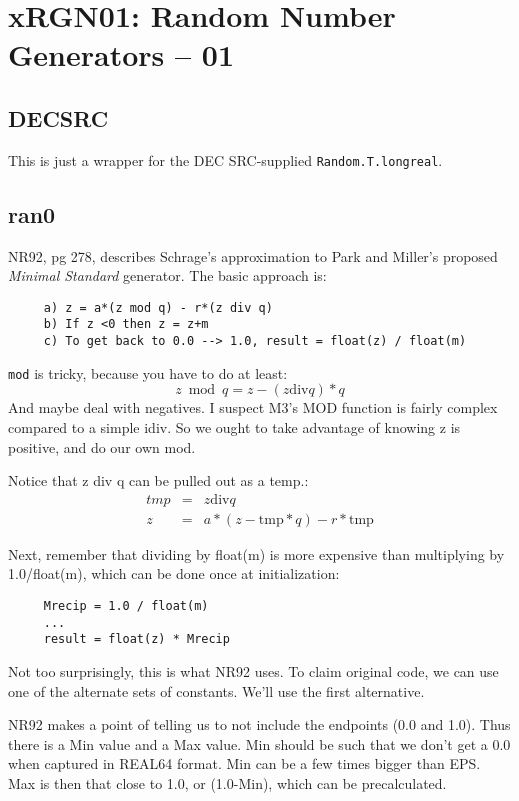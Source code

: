 \section{xRGN01: Random Number Generators -- 01}

\subsection*{DECSRC}
This is just a wrapper for the DEC SRC-supplied {\tt Random.T.longreal}.

\subsection*{ran0}
NR92, pg 278, describes Schrage's approximation to Park and Miller's
proposed {\em Minimal Standard} generator. The basic approach is:
\begin{verbatim}
     a) z = a*(z mod q) - r*(z div q)
     b) If z <0 then z = z+m
     c) To get back to 0.0 --> 1.0, result = float(z) / float(m)
\end{verbatim}
     
{\tt mod} is tricky, because you have to do at least:
\begin{equation}
  z \bmod q = z - (z \mbox{div} q)*q
\end{equation}
And maybe deal with negatives.  I suspect M3's MOD function
is fairly complex compared to a simple idiv.  So we ought to
take advantage of knowing z is positive, and do our own mod.

Notice that z div q can be pulled out as a temp.:
\begin{eqnarray}
     tmp & = & z \mbox{div} q\\
     z & = & a*(z - \mbox{tmp}*q) - r*\mbox{tmp}
\end{eqnarray}

Next, remember that dividing by float(m) is more expensive than
multiplying by 1.0/float(m), which can be done once at
initialization:
\begin{verbatim}
     Mrecip = 1.0 / float(m)
     ...
     result = float(z) * Mrecip
\end{verbatim}
     
Not too surprisingly, this is what NR92 uses.  To claim original
code, we can use one of the alternate sets of constants.
We'll use the first alternative.

NR92 makes a point of telling us to not include the
endpoints (0.0 and 1.0).  Thus there is a Min value and a
Max value.  Min should be such that we don't get a 0.0 when
captured in REAL64 format.  Min can be a few times bigger than EPS.
Max is then that close to 1.0, or (1.0-Min), which can be precalculated.

